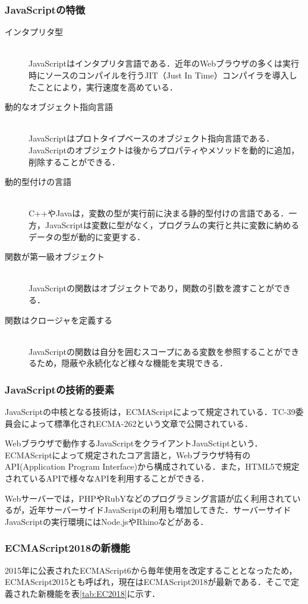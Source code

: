 \documentclass[a4j,12pt]{jsarticle}
\begin{document}
\subsubsection{JavaScriptの特徴}
\begin{description}
 \item[インタプリタ型]\mbox{}\\ 
JavaScriptはインタプリタ言語である．近年のWebブラウザの多くは実行時にソースのコンパイルを行うJIT（Just In Time）コンパイラを導入したことにより，実行速度を高めている．
 \item[動的なオブジェクト指向言語]\mbox{}\\
JavaScriptはプロトタイプベースのオブジェクト指向言語である．JavaScriptのオブジェクトは後からプロパティやメソッドを動的に追加，削除することができる．
 \item[動的型付けの言語]\mbox{}\\
C++やJavaは，変数の型が実行前に決まる静的型付けの言語である．一方，JavaScriptは変数に型がなく，プログラムの実行と共に変数に納めるデータの型が動的に変更する．	   
\item[関数が第一級オブジェクト]\mbox{}\\
JavaScriptの関数はオブジェクトであり，関数の引数を渡すことができる．	   
\item[関数はクロージャを定義する]\mbox{}\\
JavaScriptの関数は自分を囲むスコープにある変数を参照することができるため，隠蔽や永続化など様々な機能を実現できる．
\end{description}
\subsubsection{JavaScriptの技術的要素}
JavaScriptの中核となる技術は，ECMAScriptによって規定されている．TC-39委員会によって標準化されECMA-262という文章で公開されている．

Webブラウザで動作するJavaScriptをクライアントJavaSctiptという．ECMAScriptによって規定されたコア言語と，Webブラウザ特有のAPI(Application Program Interface)から構成されている．また，HTML5で規定されているAPIで様々なAPIを利用することができる．

Webサーバーでは，PHPやRubYなどのプログラミング言語が広く利用されているが，近年サーバーサイドJavaScriptの利用も増加してきた．サーバーサイドJavaScriptの実行環境にはNode.jsやRhinoなどがある．

\subsubsection{ECMAScript2018の新機能}
2015年に公表されたECMAScript6から毎年使用を改定することとなったため，ECMAScript2015とも呼ばれ，現在はECMAScript2018が最新である．そこで定義された新機能を表\ref{tab:EC2018}に示す．
\end{document}
